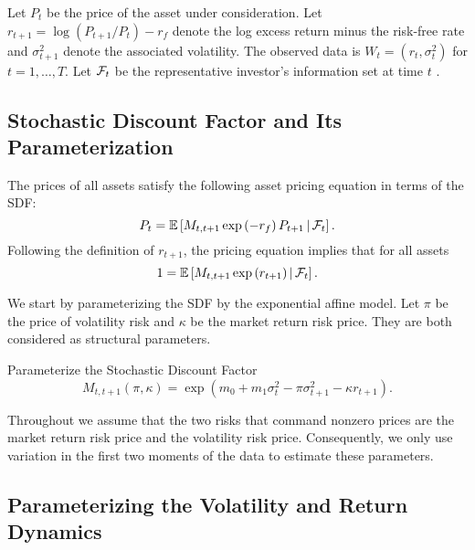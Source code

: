 \documentclass[11pt, letterpaper, twoside]{article}
\begin{document}
Let $P_t$ be the price of the asset under consideration. Let $r_{t+1}=\log(P_{t+1}/P_t)-r_f$ denote the log excess return minus the risk-free rate and $\sigma^2_{t+1}$ denote the associated volatility. The observed data is $W_t=(r_t,\sigma^2_{t})$ for $t=1,\ldots,T$. 
Let $\mathcal{F}_t$ be the representative investor's information set at time $t$ . 

\subsection{Stochastic Discount Factor and Its Parameterization}\label{sec:deriving_sdf_functions}

The prices of all assets satisfy the following asset pricing equation in terms of the SDF:
%
  \begin{equation}
    P_t = \operatorname{\mathbb{E}}\left[M_{t,t+1} \exp\left(-r_f\right) P_{t+1} \,\middle\vert\, \mathcal{F}_t \right]. 
  \end{equation}
%
  Following the definition of $r_{t+1}$, the pricing equation implies that for all assets
%
\begin{equation}
1 = \operatorname{\mathbb{E}}\left[M_{t,t+1} \exp\left(r_{t+1}\right) \,\middle\vert\, \mathcal{F}_t \right].
\end{equation}

We start by parameterizing the SDF by the exponential affine model. Let $\pi$ be the price of volatility risk and $\kappa$ be the market return risk price. They are both considered as structural parameters.

\begin{defn}{Parameterize the Stochastic Discount Factor}
 \label{defn:SDF}
%
 \begin{equation}
    M_{t,t+1}(\pi, \kappa) = \exp\left(m_{0} + m_1 \sigma_t^2 - \pi \sigma^2_{t+1} - \kappa r_{t+1}\right). 
 \end{equation}
\end{defn}

Throughout we assume that the two risks that command nonzero prices are the market return risk price and the volatility risk price. Consequently, we only use variation in the first two moments of the data to estimate these parameters. 


\subsection{Parameterizing the Volatility and Return Dynamics}
\end{document}
